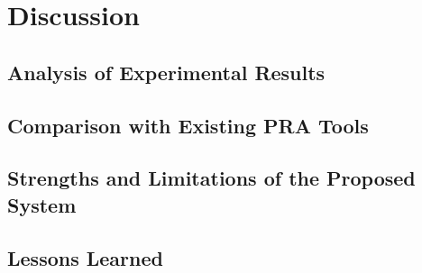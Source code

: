 \chapter{Discussion}
    \section{Analysis of Experimental Results}
    \section{Comparison with Existing PRA Tools}
    \section{Strengths and Limitations of the Proposed System}
    \section{Lessons Learned}